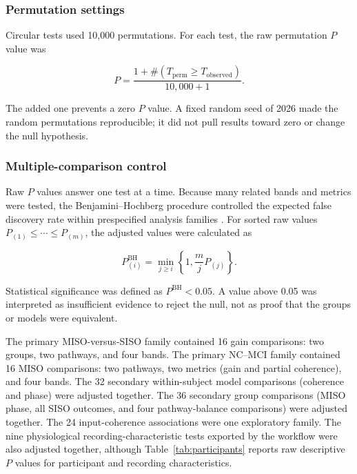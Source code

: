 \documentclass[12pt]{article}
\begin{document}
\subsubsection{Permutation settings}

Circular tests used 10,000 permutations. For each test, the raw permutation
$P$ value was

\begin{equation}
    P=\frac{1+\#\left(T_{\mathrm{perm}}\geq
    T_{\mathrm{observed}}\right)}{10{,}000+1}.
\end{equation}

The added one prevents a zero $P$ value. A fixed random seed of 2026 made the
random permutations reproducible; it did not pull results toward zero or
change the null hypothesis.

\subsubsection{Multiple-comparison control}

Raw $P$ values answer one test at a time. Because many related bands and
metrics were tested, the Benjamini--Hochberg procedure controlled the expected
false discovery rate within prespecified analysis families
\cite{BenjaminiHochberg1995}. For sorted raw values
$P_{(1)}\leq\cdots\leq P_{(m)}$, the adjusted values were calculated as

\begin{equation}
    P^{\mathrm{BH}}_{(i)}=
    \min_{j\geq i}\left\{1,\frac{m}{j}P_{(j)}\right\}.
    \label{eq:bh}
\end{equation}

Statistical significance was defined as $P^{\mathrm{BH}}<0.05$. A value above
0.05 was interpreted as insufficient evidence to reject the null, not as
proof that the groups or models were equivalent.

The primary MISO-versus-SISO family contained 16 gain comparisons: two groups,
two pathways, and four bands. The primary NC--MCI family contained 16 MISO
comparisons: two pathways, two metrics (gain and partial coherence), and four
bands. The 32 secondary within-subject model comparisons (coherence and phase)
were adjusted together. The 36 secondary group comparisons (MISO phase, all
SISO outcomes, and four pathway-balance comparisons) were adjusted together.
The 24 input-coherence associations were one exploratory family. The nine
physiological recording-characteristic tests exported by the workflow were
also adjusted together, although Table~\ref{tab:participants} reports raw
descriptive $P$ values for participant and recording characteristics.
\end{document}
